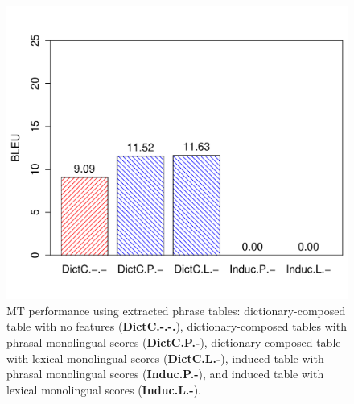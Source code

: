 \documentclass[11pt]{article}
\begin{document}
\begin{figure}[h]
\begin{center}
\includegraphics[width=\linewidth]{../figures/phrasetable/phrasetable.pdf}
\caption{MT performance using extracted phrase tables: dictionary-composed table with no features ({\bf DictC.-.-.}), dictionary-composed tables with phrasal monolingual scores ({\bf DictC.P.-}), dictionary-composed table with lexical monolingual scores ({\bf DictC.L.-}), induced table with phrasal monolingual scores ({\bf Induc.P.-}), and induced table with lexical monolingual scores ({\bf Induc.L.-}).}
\label{fig:phrasetable}
\end{center}
\vskip -0.2in
\end{figure}


\end{document}
